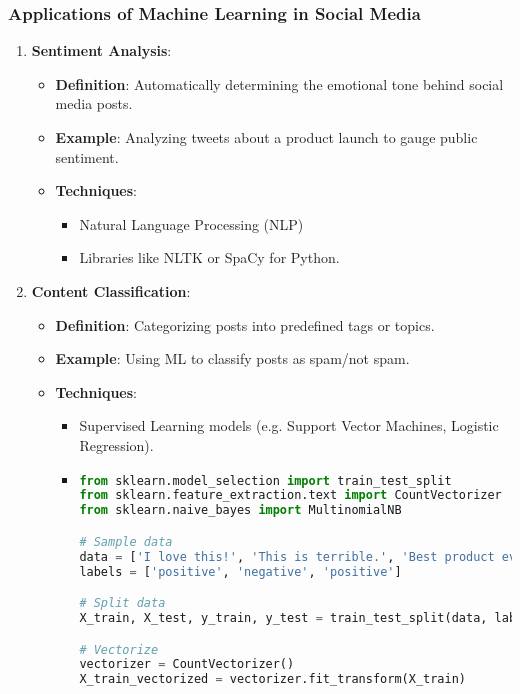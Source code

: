 \documentclass{beamer}
\begin{document}
\begin{frame}[fragile]
    \frametitle{Applications of Machine Learning in Social Media}
    \begin{enumerate}
        \item \textbf{Sentiment Analysis}:
            \begin{itemize}
                \item \textbf{Definition}: Automatically determining the emotional tone behind social media posts.
                \item \textbf{Example}: Analyzing tweets about a product launch to gauge public sentiment.
                \item \textbf{Techniques}: 
                    \begin{itemize}
                        \item Natural Language Processing (NLP)
                        \item Libraries like NLTK or SpaCy for Python.
                    \end{itemize}
            \end{itemize}
        
        \item \textbf{Content Classification}:
            \begin{itemize}
                \item \textbf{Definition}: Categorizing posts into predefined tags or topics.
                \item \textbf{Example}: Using ML to classify posts as spam/not spam.
                \item \textbf{Techniques}: 
                    \begin{itemize}
                        \item Supervised Learning models (e.g. Support Vector Machines, Logistic Regression).
                        \item \begin{lstlisting}[language=Python]
from sklearn.model_selection import train_test_split
from sklearn.feature_extraction.text import CountVectorizer
from sklearn.naive_bayes import MultinomialNB

# Sample data
data = ['I love this!', 'This is terrible.', 'Best product ever!']
labels = ['positive', 'negative', 'positive']

# Split data
X_train, X_test, y_train, y_test = train_test_split(data, labels, test_size=0.2)

# Vectorize
vectorizer = CountVectorizer()
X_train_vectorized = vectorizer.fit_transform(X_train)


\end{lstlisting}
\end{itemize}
\end{itemize}
\end{enumerate}
\end{frame}
\end{document}
